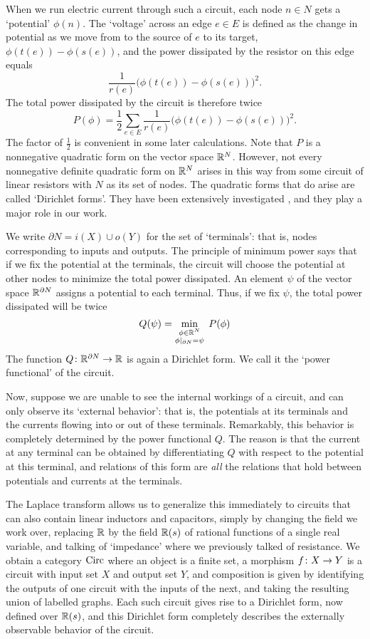 When we run electric current through such a circuit, each node $n \in N$ gets
a `potential' $\phi(n)$.  The `voltage' across an edge $e \in E$ is defined as the 
change in potential as we move from to the source of $e$ to its target, $\phi(t(e)) - 
\phi(s(e))$, and the power dissipated by the resistor on this edge equals
\[      
\frac{1}{r(e)}\big(\phi(t(e))-\phi(s(e))\big)^2. 
\]
The total power dissipated by the circuit is therefore twice
\[   
P(\phi) = \frac{1}{2}\sum_{e \in E} \frac{1}{r(e)}\big(\phi(t(e))-\phi(s(e))\big)^2.
\]
The factor of $\frac{1}{2}$ is convenient in some later calculations.  
Note that $P$ is a nonnegative quadratic form on the vector space ${\mathbb{R}}^N$.
However, not every nonnegative definite quadratic form on ${\mathbb{R}}^N$ arises in this way from some circuit of linear resistors with $N$ as its set of nodes.  The quadratic forms that do arise are called `Dirichlet forms'.  They have been extensively investigated \cite{Fukushima,MR,Sabot1997,Sabot2004}, and they play a major role in our work.

We write $\partial N = i(X) \cup o(Y)$ for the set of `terminals': that is,
nodes corresponding to inputs and outputs.    The principle of minimum
power says that if we fix the potential at the terminals, the circuit will choose
the potential at other nodes to minimize the total power dissipated.   
An element $\psi$ of the vector space ${\mathbb{R}}^{\partial N}$ assigns a potential 
to each terminal.   Thus, if we fix $\psi$, the total power dissipated will be twice
\[
  Q(\psi) = \min_{\substack{ \phi \in {\mathbb{R}}^N \\ \phi\vert_{\partial N} = \psi}} \; P(\phi)  
\]
The function $Q {\colon} {\mathbb{R}}^{\partial N} \to {\mathbb{R}}$ is again a Dirichlet form.  We call it the `power functional' of the circuit.  

Now, suppose we are unable to see the internal workings of a circuit, and can only observe its `external behavior': that is, the potentials at its terminals and the currents flowing into or out of these terminals.   Remarkably, this behavior is completely determined by the power functional $Q$.  The reason is that the current at any terminal can be obtained by differentiating $Q$ with respect to the potential at this terminal, and relations of this form are \emph{all} the relations that hold between potentials and currents at the terminals.

The Laplace transform allows us to generalize this immediately to circuits that
can also contain linear inductors and capacitors, simply by changing the field we work over, replacing ${\mathbb{R}}$ by the field ${\mathbb{R}}(s)$ of rational functions of a single real variable,
and talking of `impedance' where we previously talked of resistance.  We obtain
a category $\mathrm{Circ}$ where an object is a finite set, a morphism $f {\colon} X \to Y$ is a circuit with input set $X$ and output set $Y$, and composition is given by identifying the outputs of one circuit with the inputs of the next, and taking the resulting union of labelled graphs.  Each such circuit gives rise to a Dirichlet form, now defined over
${\mathbb{R}}(s)$, and this Dirichlet form completely describes the externally observable
behavior of the circuit.  


